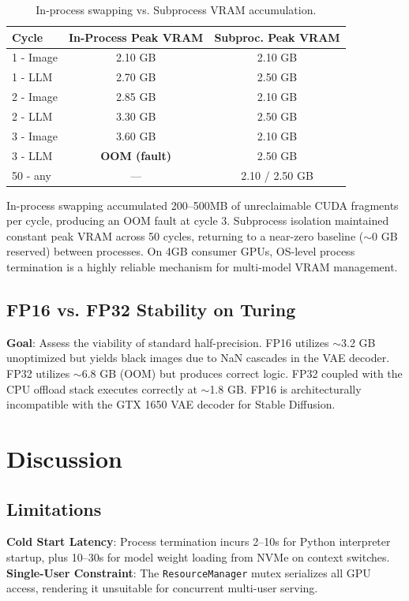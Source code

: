 \documentclass[conference]{IEEEtran}
\begin{document}
\begin{table}[h]
\centering
\begin{tabular}{lcc}
\toprule
\textbf{Cycle} & \textbf{In-Process Peak VRAM} & \textbf{Subproc. Peak VRAM} \\
\midrule
1 - Image & 2.10 GB & 2.10 GB \\
1 - LLM   & 2.70 GB & 2.50 GB \\
2 - Image & 2.85 GB & 2.10 GB \\
2 - LLM   & 3.30 GB & 2.50 GB \\
3 - Image & 3.60 GB & 2.10 GB \\
3 - LLM   & \textbf{OOM (fault)} & 2.50 GB \\
50 - any  & --- & 2.10 / 2.50 GB \\
\bottomrule
\end{tabular}
\caption{In-process swapping vs. Subprocess VRAM accumulation.}
\end{table}

In-process swapping accumulated 200--500MB of unreclaimable CUDA fragments per cycle, producing an OOM fault at cycle 3. Subprocess isolation maintained constant peak VRAM across 50 cycles, returning to a near-zero baseline ($\sim$0 GB reserved) between processes. On 4GB consumer GPUs, OS-level process termination is a highly reliable mechanism for multi-model VRAM management.

\subsection{FP16 vs. FP32 Stability on Turing}
\textbf{Goal}: Assess the viability of standard half-precision. 
FP16 utilizes $\sim$3.2 GB unoptimized but yields black images due to NaN cascades in the VAE decoder. FP32 utilizes $\sim$6.8 GB (OOM) but produces correct logic. FP32 coupled with the CPU offload stack executes correctly at $\sim$1.8 GB. FP16 is architecturally incompatible with the GTX 1650 VAE decoder for Stable Diffusion.

\section{Discussion}

\subsection{Limitations}
\textbf{Cold Start Latency}: Process termination incurs 2--10s for Python interpreter startup, plus 10--30s for model weight loading from NVMe on context switches. 
\textbf{Single-User Constraint}: The \texttt{ResourceManager} mutex serializes all GPU access, rendering it unsuitable for concurrent multi-user serving. 
\end{document}
